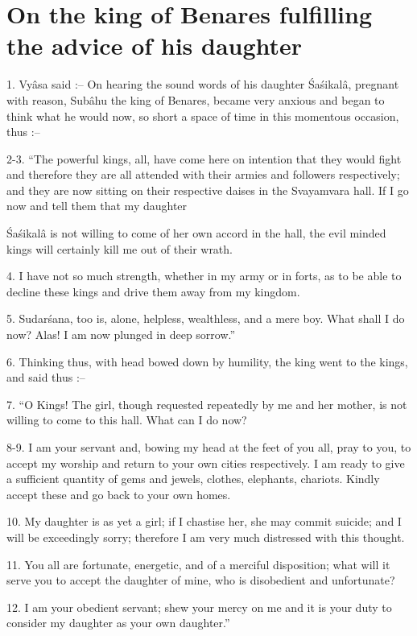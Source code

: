 ﻿\chapter{On the king of Benares fulfilling the advice of his daughter}

1. Vy\^asa said :-- On hearing the sound words of his daughter \'Sa\'sikal\^a, pregnant with reason, Sub\^ahu the king of Benares, became very anxious and began to think what he would now, so short a space of time in this momentous occasion, thus :--

2-3. ``The powerful kings, all, have come here on intention that they would fight and therefore they are all attended with their armies and followers respectively; and they are now sitting on their respective daises in the Svayamvara hall. If I go now and tell them that my daughter

\'Sa\'sikal\^a is not willing to come of her own accord in the hall, the evil minded kings will certainly kill me out of their wrath.

4. I have not so much strength, whether in my army or in forts, as to be able to decline these kings and drive them away from my kingdom.

5. Sudar\'sana, too is, alone, helpless, wealthless, and a mere boy. What shall I do now? Alas! I am now plunged in deep sorrow.''

6. Thinking thus, with head bowed down by humility, the king went to the kings, and said thus :--

7. ``O Kings! The girl, though requested repeatedly by me and her mother, is not willing to come to this hall. What can I do now?

8-9. I am your servant and, bowing my head at the feet of you all, pray to you, to accept my worship and return to your own cities respectively. I am ready to give a sufficient quantity of gems and jewels, clothes, elephants, chariots. Kindly accept these and go back to your own homes.

10. My daughter is as yet a girl; if I chastise her, she may commit suicide; and I will be exceedingly sorry; therefore I am very much distressed with this thought.

11. You all are fortunate, energetic, and of a merciful disposition; what will it serve you to accept the daughter of mine, who is disobedient and unfortunate?

12. I am your obedient servant; shew your mercy on me and it is your duty to consider my daughter as your own daughter.''

